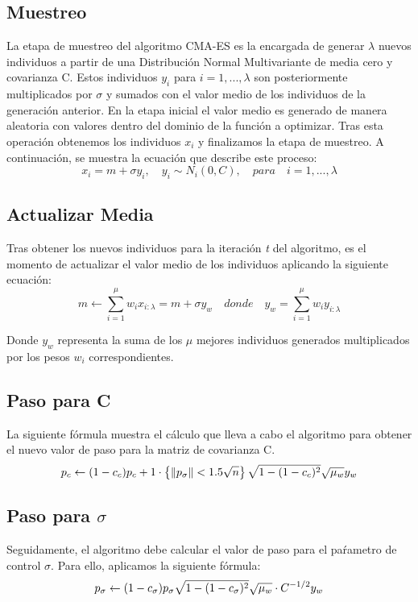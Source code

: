 \subsection{Muestreo}
La etapa de muestreo del algoritmo CMA-ES es la encargada de generar $\lambda$ nuevos individuos a partir de una Distribución Normal Multivariante de media cero y covarianza C. Estos individuos $y_{i}$ para $ i=1,...,\lambda $ son posteriormente multiplicados por $\sigma$ y sumados con el valor medio de los individuos de la generación anterior. En la etapa inicial el valor medio es generado de manera aleatoria con valores dentro del dominio de la función a optimizar. Tras esta operación obtenemos los individuos $x_{i}$ y finalizamos la etapa de muestreo. A continuación, se muestra la ecuación que describe este proceso: 
\begin{equation} \label{eq:1}
        x_{i} = m + \sigma y_{i},\quad y_{i}\sim N_{i}(0, C),\quad para\quad i=1,...,\lambda 
\end{equation}

\subsection{Actualizar Media}
Tras obtener los nuevos individuos para la iteración \textit{t} del algoritmo, es el momento de actualizar el valor medio de los individuos aplicando la siguiente ecuación: 
\begin{equation} \label{eq:2}
    m \leftarrow \sum_{i=1}^{\mu} w_{i}x_{i:\lambda} = m + \sigma y_{w}\quad donde\quad y_{w} = \sum_{i=1}^{\mu} w_{i}y_{i:\lambda} 
\end{equation}

Donde $y_{w}$ representa la suma de los $\mu$ mejores individuos generados multiplicados por los pesos $w_{i}$ correspondientes.

\subsection{Paso para C}
La siguiente fórmula muestra el cálculo que lleva a cabo el algoritmo para obtener el nuevo valor de paso para la matriz de covarianza C.
\begin{equation} \label{eq:3}
   p_{c} \leftarrow (1 - c_{c})p_{c} + 1\cdot\left \{ \left \|p_{\sigma}\right \|< 1.5 \sqrt{n} \right \} \sqrt{1 - (1 - c_{c})^2}\sqrt{\mu_{w}}y_{w} \\
\end{equation}


\subsection{Paso para $ \sigma $}
Seguidamente, el algoritmo debe calcular el valor de paso para el paŕametro de control $\sigma$. Para ello, aplicamos la siguiente fórmula:
\begin{equation} \label{eq:4}
     p_{\sigma} \leftarrow (1 - c_{\sigma})p_{\sigma}\sqrt{1 - (1 - c_{\sigma})^2}\sqrt{\mu_{w}}\cdot C^{-1/2}y_{w} \\
\end{equation}

